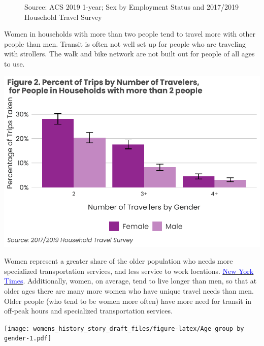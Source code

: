 \documentclass[
  12pt,
]{article}
\begin{document}
\begin{figure}
\caption{Source: ACS 2019 1-year; Sex by Employment Status and 2017/2019 Household Travel Survey}\label{fig:matrix}
\end{figure}
\begin{flushleft}
Women in households with more than two people tend to travel more with other people than men. Transit is often not well set up for people who are traveling with strollers. The walk and bike network are not built out for people of all ages to use.
\end{flushleft}

\includegraphics{womens_history_story_draft_files/figure-latex/Trips by Number of Travellers-1.pdf}

\begin{flushleft}
Women represent a greater share of the older population who needs more specialized transportation services, and less service to work locations. \href{https://www.nytimes.com/2022/12/03/health/elderly-living-alone.html}{\underline{\textcolor{blue}{New York Times}}}. Additionally, women, on average, tend to live longer than men, so that at older ages there are many more women who have unique travel needs than men. Older people (who tend to be women more often) have more need for transit in off-peak hours and specialized transportation services. 
\end{flushleft}

\texttt{[image: womens\_history\_story\_draft\_files/figure-latex/Age group by gender-1.pdf]}
\end{document}
